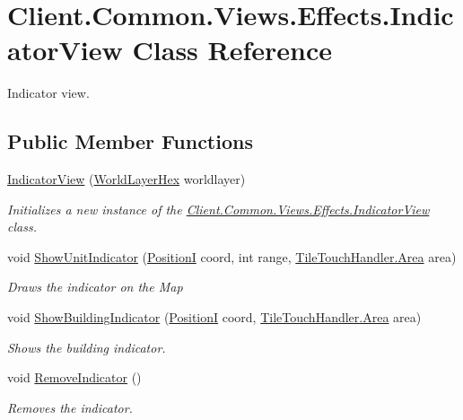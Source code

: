 \hypertarget{classClient_1_1Common_1_1Views_1_1Effects_1_1IndicatorView}{}\section{Client.\+Common.\+Views.\+Effects.\+Indicator\+View Class Reference}
\label{classClient_1_1Common_1_1Views_1_1Effects_1_1IndicatorView}


Indicator view.  


\subsection*{Public Member Functions}
\begin{DoxyCompactItemize}
\item 
\hyperlink{classClient_1_1Common_1_1Views_1_1Effects_1_1IndicatorView_ae96aa958df4385eb14c9489c36a009a5}{Indicator\+View} (\hyperlink{classClient_1_1Common_1_1Views_1_1WorldLayerHex}{World\+Layer\+Hex} worldlayer)
\begin{DoxyCompactList}\small\item\em Initializes a new instance of the \hyperlink{classClient_1_1Common_1_1Views_1_1Effects_1_1IndicatorView}{Client.\+Common.\+Views.\+Effects.\+Indicator\+View} class. \end{DoxyCompactList}\item 
void \hyperlink{classClient_1_1Common_1_1Views_1_1Effects_1_1IndicatorView_af69b87dde434a01884cdcbda4c043d8f}{Show\+Unit\+Indicator} (\hyperlink{classCore_1_1Models_1_1PositionI}{Position\+I} coord, int range, \hyperlink{classClient_1_1Common_1_1Views_1_1TileTouchHandler_a037469785439a69ce6508447be45dc6a}{Tile\+Touch\+Handler.\+Area} area)
\begin{DoxyCompactList}\small\item\em Draws the indicator on the Map \end{DoxyCompactList}\item 
void \hyperlink{classClient_1_1Common_1_1Views_1_1Effects_1_1IndicatorView_a073d6228fa94949315e29ba9b9520fb1}{Show\+Building\+Indicator} (\hyperlink{classCore_1_1Models_1_1PositionI}{Position\+I} coord, \hyperlink{classClient_1_1Common_1_1Views_1_1TileTouchHandler_a037469785439a69ce6508447be45dc6a}{Tile\+Touch\+Handler.\+Area} area)
\begin{DoxyCompactList}\small\item\em Shows the building indicator. \end{DoxyCompactList}\item 
void \hyperlink{classClient_1_1Common_1_1Views_1_1Effects_1_1IndicatorView_a3c759b6ec6bd7b533286e21b703e96b3}{Remove\+Indicator} ()
\begin{DoxyCompactList}\small\item\em Removes the indicator. \end{DoxyCompactList}\end{DoxyCompactItemize}


